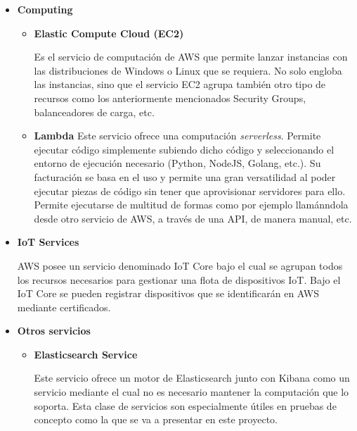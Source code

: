\documentclass[../../memoria.tex]{subfiles}
\begin{document}
\begin{itemize}
      \item \textbf{Computing}
            \begin{itemize}
                  \item \textbf{Elastic Compute Cloud (EC2)}
                        \par
                        Es el servicio de computación de AWS que permite lanzar instancias con las distribuciones de Windows o Linux que se requiera. No solo engloba las instancias, sino que el servicio EC2 agrupa también otro tipo de recursos como los anteriormente mencionados Security Groups, balanceadores de carga, etc.
                  \item \textbf{Lambda}
                        Este servicio ofrece una computación \textit{serverless}. Permite ejecutar código simplemente subiendo dicho código y seleccionando el entorno de ejecución necesario (Python, NodeJS, Golang, etc.). Su facturación se basa en el uso y permite una gran versatilidad al poder ejecutar piezas de código sin tener que aprovisionar servidores para ello. Permite ejecutarse de multitud de formas como por ejemplo llamánndola desde otro servicio de AWS, a través de una API, de manera manual, etc.
                        \par
            \end{itemize}

      \item \textbf{IoT Services}
            \par
            AWS posee un servicio denominado IoT Core bajo el cual se agrupan todos los recursos necesarios para gestionar una flota de dispositivos IoT. Bajo el IoT Core se pueden registrar dispositivos que se identificarán en AWS mediante certificados.

      \item \textbf{Otros servicios}
            \begin{itemize}
                  \item \textbf{Elasticsearch Service}
                        \par
                        Este servicio ofrece un motor de Elasticsearch junto con Kibana como un servicio mediante el cual no es necesario mantener la computación que lo soporta. Esta clase de servicios son especialmente útiles en pruebas de concepto como la que se va a presentar en este proyecto.
            \end{itemize}
\end{itemize}
\end{document}
